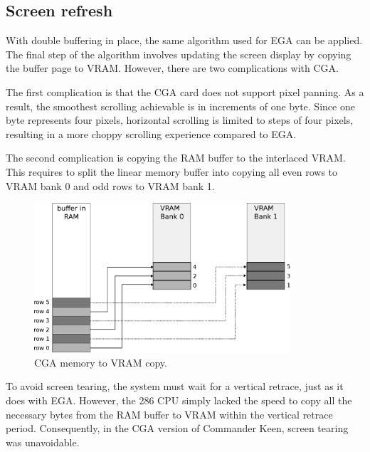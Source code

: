 \documentclass[book.tex]{subfiles}
\begin{document}
\pagebreak
\subsection{Screen refresh}
With double buffering in place, the same algorithm used for EGA can be applied. The final step of the algorithm involves updating the screen display by copying the buffer page to VRAM. However, there are two complications with CGA.\\

\par
The first complication is that the CGA card does not support pixel panning. As a result, the smoothest scrolling achievable is in increments of one byte. Since one byte represents four pixels, horizontal scrolling is limited to steps of four pixels, resulting in a more choppy scrolling experience compared to EGA. \\

\par
\begin{minipage}{\textwidth}
  
\end{minipage}
\label{state_type}

\par
The second complication is copying the RAM buffer to the interlaced VRAM. This requires to split the linear memory buffer into copying all even rows to VRAM bank 0 and odd rows to VRAM bank 1.

\begin{figure}[H]
\centering
\includegraphics[width=0.85\textwidth]{imgs/drawings/cga_VRAM_copy.eps}
\caption{CGA memory to VRAM copy.}
\label{fig:cga_interlaced}
\end{figure}

\par
To avoid screen tearing, the system must wait for a vertical retrace, just as it does with EGA. However, the 286 CPU simply lacked the speed to copy all the necessary bytes from the RAM buffer to VRAM within the vertical retrace period. Consequently, in the CGA version of Commander Keen, screen tearing was unavoidable.\\


\par
\begin{minipage}{\textwidth}
  
\end{minipage}
\label{cga_screen_refresh}
\end{document}
